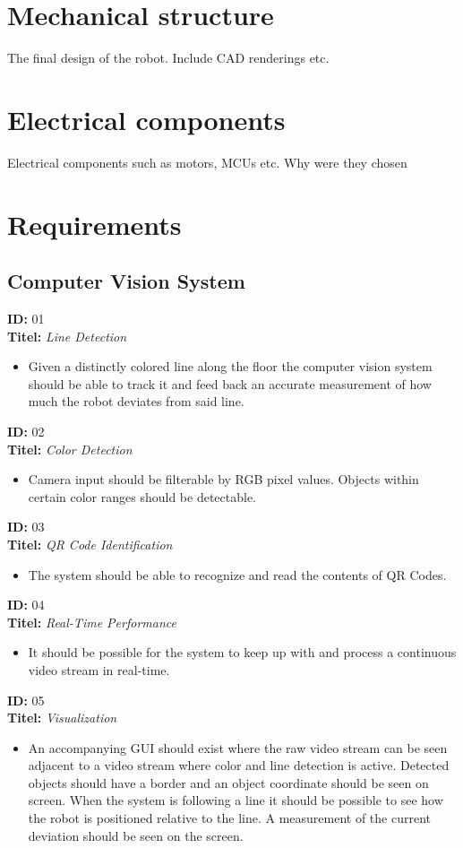 \section*{Mechanical structure}
The final design of the robot. Include CAD renderings etc. 
\section*{Electrical components}
Electrical components such as motors, MCUs etc. Why were they chosen

\section*{Requirements}
\subsection*{Computer Vision System}
\textbf{ID:} 01 \\
\textbf{Titel:} \emph{Line Detection}
\begin{itemize}
    \item Given a distinctly colored line along the floor the computer vision system should be able to track it and
    feed back an accurate measurement of how much the robot deviates from said line.
\end{itemize}
\textbf{ID:} 02 \\
\textbf{Titel:} \emph{Color Detection}
\begin{itemize}
    \item Camera input should be filterable by RGB pixel values. Objects within certain color ranges should be detectable.
\end{itemize}
\textbf{ID:} 03 \\
\textbf{Titel:} \emph{QR Code Identification}
\begin{itemize}
    \item The system should be able to recognize and read the contents of QR Codes.
\end{itemize}
\textbf{ID:} 04 \\
\textbf{Titel:} \emph{Real-Time Performance}
\begin{itemize}
    \item It should be possible for the system to keep up with and process a continuous video stream in real-time.
\end{itemize}
\textbf{ID:} 05 \\
\textbf{Titel:} \emph{Visualization}
\begin{itemize}
    \item An accompanying GUI should exist where the raw video stream can be seen adjacent to a video stream where color
    and line detection is active. Detected objects should have a border and an object coordinate should be seen on screen.
    When the system is following a line it should be possible to see how the robot is positioned relative to the line.
    A measurement of the current deviation should be seen on the screen.
\end{itemize}
